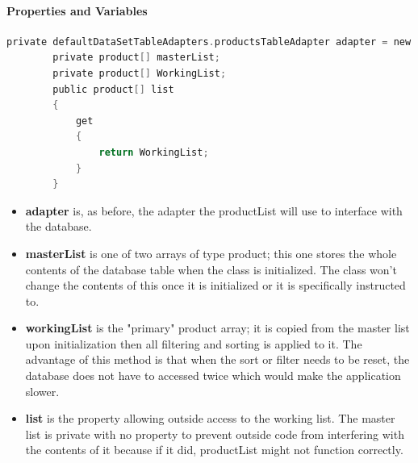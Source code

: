 ﻿\documentclass{article}
\begin{document}
    \paragraph{Properties and Variables}
    \begin{lstlisting}[language=C]
		private defaultDataSetTableAdapters.productsTableAdapter adapter = new defaultDataSetTableAdapters.productsTableAdapter();
		private product[] masterList;
		private product[] WorkingList;
		public product[] list
		{
			get
			{
				return WorkingList;
			}
		}
    \end{lstlisting}
    \begin{itemize}
        \item \textbf{adapter} is, as before, the adapter the productList will use to interface with the database.
        \item \textbf{masterList} is one of two arrays of type product; this one stores the whole contents of the database table when the class is initialized.
        The class won't change the contents of this once it is initialized or it is specifically instructed to.
        \item \textbf{workingList} is the "primary" product array; it is copied from the master list upon initialization then all filtering and sorting is applied to it.
        The advantage of this method is that when the sort or filter needs to be reset, the database does not have to accessed twice which would make the application slower.
        \item \textbf{list} is the property allowing outside access to the working list.
        The master list is private with no property to prevent outside code from interfering with the contents of it because if it did, productList might not function correctly.
    \end{itemize}
\end{document}
